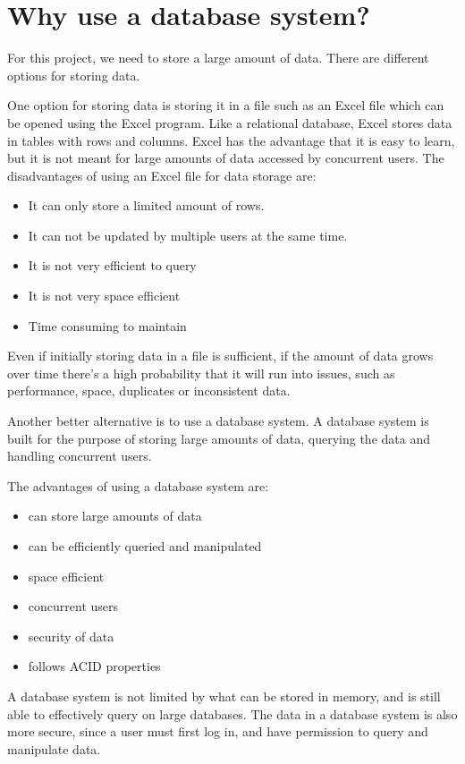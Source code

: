 \section{Why use a database system?}
For this project, we need to store a large amount of data. 
There are different options for storing data.

One option for storing data is storing it in a file such as an Excel file which can be opened using the Excel program. Like a relational database, Excel stores data in tables with rows and columns. Excel has the advantage that it is easy to learn, but it is not meant for large amounts of data accessed by concurrent users. 
The disadvantages of using an Excel file for data storage are:

\begin{itemize}
    \item It can only store a limited amount of rows. 
    \item It can not be updated by multiple users at the same time. 
    \item It is not very efficient to query
    \item It is not very space efficient
    \item Time consuming to maintain
\end{itemize}

Even if initially storing data in a file is sufficient, if the amount of data grows over time there's a high probability that it will run into issues, such as performance, space, duplicates or inconsistent data.
\cite{ExcelDatabase}

Another better alternative is to use a database system. A database system is built for the purpose of storing large amounts of data, querying the data and handling concurrent users.

The advantages of using a database system are:
\begin{itemize}
    \item can store large amounts of data
    \item can be efficiently queried and manipulated
    \item space efficient
    \item concurrent users
    \item security of data
    \item follows ACID properties
\end{itemize}

A database system is not limited by what can be stored in memory, and is still able to effectively query on large databases. The data in a database system is also more secure, since a user must first log in, and have permission to query and manipulate data. 
\cite{WhyDatabase}

